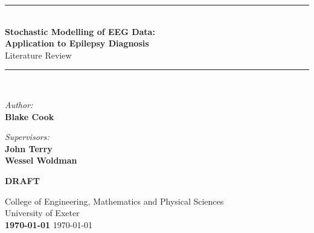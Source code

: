 \begin{titlepage}
  \begin{center}

    \vspace*{1cm}

    \rule{\linewidth}{0.5mm}  \\[0.4cm]        
    
    \Huge \textbf{Stochastic Modelling of EEG Data:}  \\[0.2cm]
      \huge \textbf{Application to Epilepsy Diagnosis}  \\[0.4cm]
      \LARGE Literature Review  \\
    
    \rule{\linewidth}{0.5mm}  \\[1.5cm]        
    
    \vspace{0.5cm}

    \textit{Author:}  \\
      \textbf{Blake Cook} 
    
    \vspace{0.5cm}

    \textit{Supervisors:}  \\
      \textbf{John Terry}  \\
      \textbf{Wessel Woldman}

    \if{}
      \vspace{0.5cm}
      \Huge \textbf{DRAFT} \\
    \fi

    \vfill
    
    \vspace{0.8cm} 

    \Large College of Engineering, Mathematics and Physical Sciences  \\
    \Large University of Exeter  \\

    \if{}
      \draftdate
      \textbf{\today}
    \else
      \monthyeardate
      \today
    \fi

  \end{center}
\end{titlepage}


